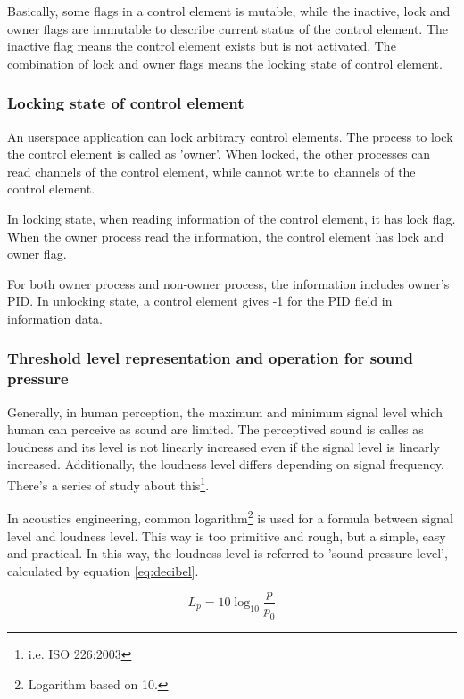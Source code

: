 \documentclass[onecolumn]{article}
\begin{document}
Basically, some flags in a control element is mutable, while the inactive, lock and owner flags are immutable to describe current status of the control element. The inactive flag means the control element exists but is not activated. The combination of lock and owner flags means the locking state of control element.


\subsubsection{Locking state of control element}

An userspace application can lock arbitrary control elements. The process to lock the control element is called as 'owner'. When locked, the other processes can read channels of the control element, while cannot write to channels of the control element.

In locking state, when reading information of the control element, it has lock flag. When the owner process read the information, the control element has lock and owner flag.

For both owner process and non-owner process, the information includes owner's PID. In unlocking state, a control element gives -1 for the PID field in information data.


\subsubsection{Threshold level representation and operation for sound pressure}

Generally, in human perception, the maximum and minimum signal level which human can perceive as sound are limited. The perceptived sound is calles as loudness and its level is not linearly increased even if the signal level is linearly increased. Additionally, the loudness level differs depending on signal frequency. There's a series of study about this\footnote{i.e. ISO 226:2003}.

In acoustics engineering, common logarithm\footnote{Logarithm based on 10.} is used for a formula between signal level and loudness level. This way is too primitive and rough, but a simple, easy and practical. In this way, the loudness level is referred to 'sound pressure level', calculated by equation \ref{eq:decibel}.

\begin{equation}
L_p = 10 \log_{10} \frac{p}{p_0} \label{eq:decibel}
\end{equation}
\end{document}
